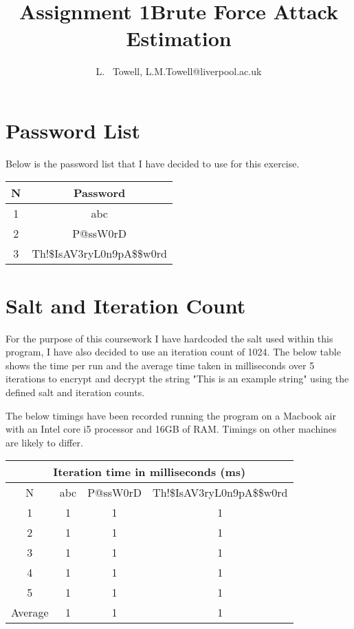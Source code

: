 \documentclass[a4paper, twoside, 11pt]{article}
\author{L. ~Towell, L.M.Towell@liverpool.ac.uk}
\title{Assignment 1\break Brute Force Attack Estimation}
\begin{document}
	\maketitle

\maketitle
\section{Password List}
Below is the password list that I have decided to use for this exercise.
\begin{center}
	\begin{tabular}{ |c|c| } 
	 \hline
	 N & Password \\
	 \hline
	 1 & abc \\ 
	 2 & P@ssW0rD \\ 
	 3 & Th!\$IsAV3ryL0n9pA\$\$w0rd \\ 
	 \hline
	\end{tabular}
\end{center}

\section{Salt and Iteration Count}
For the purpose of this coursework I have hardcoded the salt used within this program, 
I have also decided to use an iteration count of 1024. The below table shows the time per run and the average time
 taken in milliseconds over 5 iterations to encrypt and decrypt the string "This is an example string" using the 
 defined salt and iteration counts.

 The below timings have been recorded running the program on a Macbook air with an Intel core i5 processor and 16GB of RAM. Timings on other machines are likely to differ.

\begin{center}
	\begin{tabular}{ |c|c|c|c| } 
	 \hline
	 \multicolumn{4}{|c|}{Iteration time in milliseconds (ms)} \\
	 \hline
	 N & abc & P@ssW0rD & Th!\$IsAV3ryL0n9pA\$\$w0rd \\
	 \hline
	 1 & 1 & 1 & 1 \\ 
	 2 & 1 & 1 & 1  \\ 
	 3 & 1 & 1 & 1  \\ 
	 4 & 1 & 1 & 1  \\
	 5 & 1 & 1 & 1  \\
	 \hline
	 \hline
	 Average & 1 & 1 & 1  \\
	 \hline
	\end{tabular}
\end{center}
\end{document}
